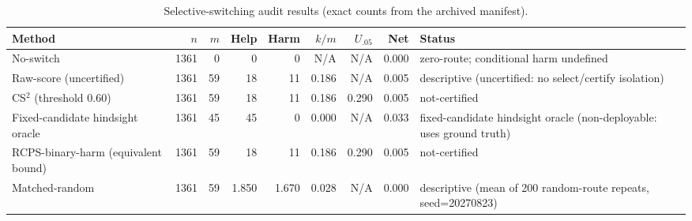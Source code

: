 \begin{table}[t]
\centering
\caption{Selective-switching audit results (exact counts from the archived manifest).}
\label{tab:cs2_main}
\begin{tabular}{lrrrrrrrl}
\toprule
Method & $n$ & $m$ & Help & Harm & $k/m$ & $U_{.05}$ & Net & Status \\
\midrule
No-switch & 1361 & 0 & 0 & 0 & N/A & N/A & 0.000 & zero-route; conditional harm undefined \\
Raw-score (uncertified) & 1361 & 59 & 18 & 11 & 0.186 & N/A & 0.005 & descriptive (uncertified: no select/certify isolation) \\
CS$^2$ (threshold 0.60) & 1361 & 59 & 18 & 11 & 0.186 & 0.290 & 0.005 & not-certified \\
Fixed-candidate hindsight oracle & 1361 & 45 & 45 & 0 & 0.000 & N/A & 0.033 & fixed-candidate hindsight oracle (non-deployable: uses ground truth) \\
RCPS-binary-harm (equivalent bound) & 1361 & 59 & 18 & 11 & 0.186 & 0.290 & 0.005 & not-certified \\
Matched-random & 1361 & 59 & 1.850 & 1.670 & 0.028 & N/A & 0.000 & descriptive (mean of 200 random-route repeats, seed=20270823) \\
\bottomrule
\end{tabular}
\end{table}
